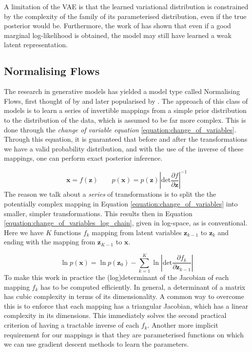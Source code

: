 \documentclass{report}
\newcommand{\bx}{\mathbf{x}}
\newcommand{\bz}{\mathbf{z}}
\newcommand{\parfrac}[2]{\frac{\partial #1}{\partial#2}}
\begin{document}
A limitation of the VAE is that the learned variational distribution is constrained by the complexity of the family of its parameterised distribution, even if the true posterior would be. Furthermore, the work of \textcite{alemi2017fixing} has shown that even if a good marginal log-likelihood is obtained, the model may still have learned a weak latent representation.

\subsection{Normalising Flows}
The research in generative models has yielded a model type called Normalising Flows, first thought of by \textcite{tabak2013family} and later popularised by \textcite{rezende2016variational}. The approach of this class of models is to learn a series of invertible mappings from a simple prior distribution to the distribution of the data, which is assumed to be far more complex. This is done through the \textit{change of variable equation} \ref{equation:change_of_variables}. Through this equation, it is guaranteed that before and after the transformations we have a valid probability distribution, and with the use of the inverse of these mappings, one can perform exact posterior inference. 


\begin{equation}\label{equation:change_of_variables}
    \bx = f(\bz) \qquad p(\bx) = p(\bz) \left|\text{det} \parfrac{f}{\bz} \right|^{-1}
\end{equation}
The reason we talk about a \textit{series} of transformations is to split the the potentially complex mapping in Equation \ref{equation:change_of_variables} into smaller, simpler transformations. This results then in Equation \ref{equation:change_of_variables_log_chain}, given in log-space, as is conventional. Here we have $K$ functions $f_k$ mapping from latent variables $\bz_{k-1}$ to $\bz_k$ and ending with the mapping from $\bz_{K-1}$ to $\bx$.

\begin{equation}\label{equation:change_of_variables_log_chain}
    \ln p(\bx) = \ln p(\bz_0) - \sum\limits^K_{k=1}\ln \left| \text{det} \parfrac{f_k}{\bz_{k-1}} \right|
\end{equation}
To make this work in practice the (log)determinant of the Jacobian of each mapping $f_k$ has to be computed efficiently. In general, a determinant of a matrix has cubic complexity in terms of its dimensionality. A common way to overcome this is to enforce that each mapping has a triangular Jacobian, which has a linear complexity in its dimensions. This immediately solves the second practical criterion of having a tractable inverse of each $f_k$. Another more implicit requirement for our mappings is that they are parameterised functions on which we can use gradient descent methods to learn the parameters. 
\end{document}
